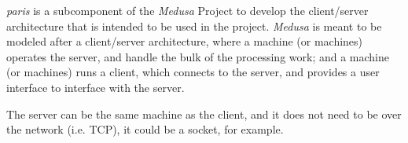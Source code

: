 \documentclass{article}
\begin{document}
	\textit{paris} is a subcomponent of the \textit{Medusa} Project to develop
	the client/server architecture that is intended to be used in the project.
	\textit{Medusa} is meant to be modeled after a client/server architecture,
	where a machine (or machines) operates the server, and handle the bulk of
	the processing work; and a machine (or machines) runs a client, which
	connects to the server, and provides a user interface to interface with the
	server.

	The server can be the same machine as the client, and it does not need to be
	over the network (i.e. TCP), it could be a socket, for example.
\end{document}
